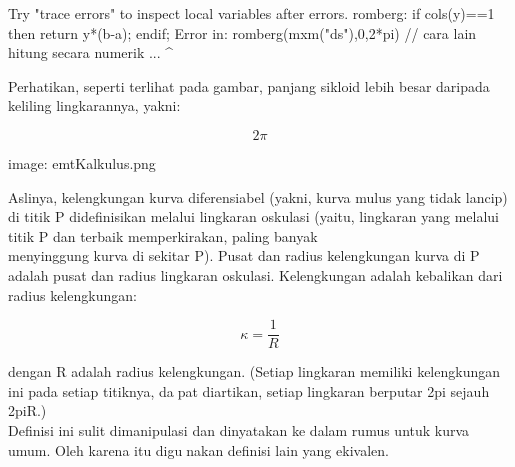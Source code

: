 \documentclass[12pt,Times new roman,letterpaper]{book}
\begin{document}
\begin{eulernootebook}
\begin{eulercomment}
\begin{eulercomment}
\begin{eulernootebook}
\begin{eulercomment}
\begin{eulercomment}
\begin{eulercomment}
\begin{eulercomment}
\begin{eulercomment}
\begin{eulercomment}
\begin{eulernotebook}
\begin{eulercomment}
\begin{eulercomment}
\begin{eulercomment}
\begin{eulercomment}
\begin{eulercomment}
\begin{eulercomment}
\begin{eulercomment}
\begin{eulercomment}
\begin{eulercomment}
\begin{eulercomment}
\begin{eulercomment}
\begin{eulercomment}
\begin{eulercomment}
\begin{eulercomment}
\begin{eulercomment}
\begin{eulercomment}
\begin{euleroutput}
  Try "trace errors" to inspect local variables after errors.
  romberg:
      if cols(y)==1 then return y*(b-a); endif;
  Error in:
  romberg(mxm("ds"),0,2*pi) // cara lain hitung secara numerik ...
                           ^
\end{euleroutput}
\begin{eulercomment}
Perhatikan, seperti terlihat pada gambar, panjang sikloid lebih besar
daripada keliling lingkarannya, yakni:\\
\end{eulercomment}
\begin{eulerformula}
\[
2\pi
\]
\end{eulerformula}
\begin{eulercomment}
\begin{eulercomment}
\begin{eulercomment}
image: emtKalkulus.png

Aslinya, kelengkungan kurva diferensiabel (yakni, kurva mulus yang
tidak lancip) di titik P didefinisikan melalui lingkaran oskulasi
(yaitu, lingkaran yang melalui titik P dan terbaik memperkirakan,
paling banyak\\
menyinggung kurva di sekitar P). Pusat dan radius kelengkungan kurva
di P adalah pusat dan radius lingkaran oskulasi. Kelengkungan adalah
kebalikan dari radius kelengkungan:


\end{eulercomment}
\begin{eulerformula}
\[
\kappa = \frac{1}{R}
\]
\end{eulerformula}
\begin{eulercomment}
dengan R adalah radius kelengkungan. (Setiap lingkaran memiliki
kelengkungan ini pada setiap titiknya, dapat diartikan, setiap
lingkaran berputar 2pi sejauh 2piR.)\\
Definisi ini sulit dimanipulasi dan dinyatakan ke dalam rumus untuk
kurva umum. Oleh karena itu digunakan definisi lain yang ekivalen.


\end{eulercomment}
\end{eulercomment}
\end{eulercomment}
\end{eulercomment}
\end{eulercomment}
\end{eulercomment}
\end{eulercomment}
\end{eulercomment}
\end{eulercomment}
\end{eulercomment}
\end{eulercomment}
\end{eulercomment}
\end{eulercomment}
\end{eulercomment}
\end{eulercomment}
\end{eulercomment}
\end{eulercomment}
\end{eulercomment}
\end{eulercomment}
\end{eulernotebook}
\end{eulercomment}
\end{eulercomment}
\end{eulercomment}
\end{eulercomment}
\end{eulercomment}
\end{eulercomment}
\end{eulernootebook}
\end{eulercomment}
\end{eulercomment}
\end{eulernootebook}
\end{document}

